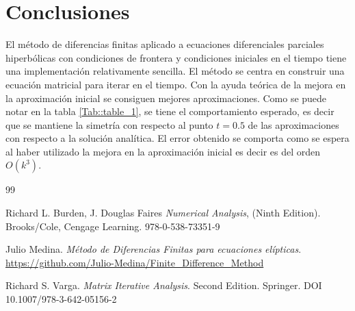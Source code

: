 \documentclass[a4paper]{article}
\begin{document}
\section{Conclusiones}
El método de diferencias finitas aplicado a ecuaciones diferenciales parciales hiperbólicas con condiciones de frontera y condiciones iniciales en el tiempo tiene una implementación relativamente sencilla. El método se centra en construir una ecuación matricial para iterar en el tiempo. Con la ayuda teórica de la mejora en la aproximación inicial se consiguen mejores aproximaciones. Como se puede notar en la  tabla \ref{Tab::table_1}, se tiene el comportamiento esperado, es decir que se mantiene la simetría con respecto al punto $t=0.5$ de las aproximaciones con respecto a la solución analítica. El error obtenido se comporta como se espera al haber utilizado la mejora en la aproximación inicial es decir es del orden $O(k^3)$.


\begin{thebibliography}{99}

 Richard L. Burden, J. Douglas Faires \textit{Numerical Analysis}, (Ninth Edition). Brooks/Cole, Cengage Learning. 978-0-538-73351-9

 Julio Medina. \textit{Método de Diferencias Finitas para ecuaciones elípticas}. \url{https://github.com/Julio-Medina/Finite_Difference_Method}

 Richard S. Varga. \textit{Matrix Iterative Analysis}. Second Edition. Springer. DOI 10.1007/978-3-642-05156-2






\end{thebibliography}
\end{document}
